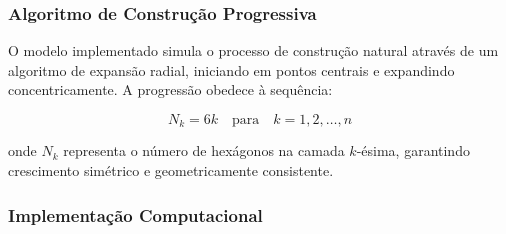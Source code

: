 \documentclass[12pt,a4paper,oneside]{extarticle}
\begin{document}

\subsubsection{Algoritmo de Construção Progressiva}
O modelo implementado simula o processo de construção natural através de um algoritmo de expansão radial, iniciando em pontos centrais e expandindo concentricamente. A progressão obedece à sequência:

\begin{equation}
N_k = 6k \quad \text{para} \quad k = 1, 2, \ldots, n
\label{eq:progressive_growth}
\end{equation}

onde $N_k$ representa o número de hexágonos na camada $k$-ésima, garantindo crescimento simétrico e geometricamente consistente.

\clearpage

\subsubsection{Implementação Computacional}
\end{document}
